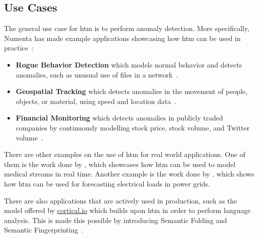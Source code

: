 \subsection{Use Cases}
The general use case for \gls*{htm} is to perform anomaly detection. More specifically, Numenta has made example applications showcasing how \gls*{htm} can be used in practice~\cite{numenta_example_apps}:
\begin{itemize}
    \item \textbf{Rogue Behavior Detection} which models normal behavior and detects anomalies, such as unusual use of files in a network~\cite{htm_rogue}.
    \item \textbf{Geospatial Tracking} which detects anomalies in the movement of people, objects, or material, using speed and location data~\cite{htm_geospatial}.
    \item \textbf{Financial Monitoring} which detects anomalies in publicly traded companies by continuously modelling stock price, stock volume, and Twitter volume~\cite{htm_finance}.
\end{itemize}
There are other examples on the use of \gls*{htm} for real world applications. One of them is the work done by \textcite{htm_medicine}, which showcases how \gls*{htm} can be used to model medical streams in real time. Another example is the work done by \textcite{htm_electrical_load}, which shows how \gls*{htm} can be used for forecasting electrical loads in power grids.
\par
There are also applications that are actively used in production, such as the model offered by \href{www.cortical.io}{cortical.io} which builds upon \gls*{htm} in order to perform language analysis. This is made this possible by introducing Semantic Folding and Semantic Fingerprinting~\cite{semantic_folding}.
